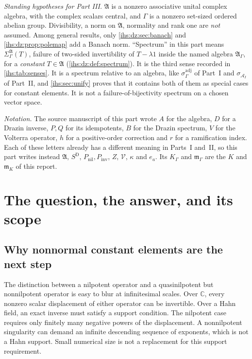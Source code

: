 \documentclass[11pt,a4paper]{article}
\numberwithin{equation}{section}
\theoremstyle{definition}
\theoremstyle{remark}
\newcommand{\C}{\mathbb C}
\newcommand{\K}{K}
\newcommand{\mK}{\mathfrak m_K}
\newcommand{\Arf}{\mathcal A_I}
\newcommand{\Alg}{\mathfrak A}
\newcommand{\AlgG}{\mathfrak A_\Gamma}
\newcommand{\SigA}{\Sigma^{\Alg}_\Gamma}
\begin{document}
\emph{Standing hypotheses for Part III.} $\Alg$ is a nonzero associative
unital complex algebra, with the complex scalars central, and $\Gamma$ is a
nonzero set-sized ordered abelian group. Divisibility, a norm on $\Alg$,
normality and rank one are \emph{not} assumed. Among general results, only
\cref{ihs:dz:sec:banach} and \cref{ihs:dz:prop:polemap} add a Banach norm.
``Spectrum'' in this part means $\SigA(T)$, failure of two-sided
invertibility of $T-\lambda1$ inside the named algebra $\AlgG$, for a
\emph{constant} $T\in\Alg$ (\cref{ihs:dz:def:spectrum}). It is the third
sense recorded in \cref{ihs:tab:senses}. It is a spectrum relative to an
algebra, like $\sigma^{\mathrm{adj}}_\Gamma$ of Part~I and $\sigma_{\Arf}$ of
Part~II, and \cref{ihs:sec:unify} proves that it contains both of them as
special cases for constant elements. It is not a failure-of-bijectivity
spectrum on a chosen vector space.

\emph{Notation.} The source manuscript of this part wrote $A$ for the
algebra, $D$ for a Drazin inverse, $P,Q$ for its idempotents, $B$ for the
Drazin spectrum, $V$ for the Volterra operator, $h$ for a positive-order
correction and $r$ for a ramification index. Each of these letters already
has a different meaning in Parts~I and~II, so this part writes instead
$\Alg$, $S^{\mathrm D}$, $P_{\mathrm{nil}},P_{\mathrm{inv}}$, $Z$,
$\mathcal V$, $\kappa$ and $e_a$. Its $K_\Gamma$ and $\mathfrak m_\Gamma$
are the $\K$ and $\mK$ of this report.

\section{The question, the answer, and its scope}\label{ihs:dz:sec:intro}

\subsection{Why nonnormal constant elements are the next step}\label{ihs:dz:sec:why}
The distinction between a nilpotent operator and a quasinilpotent but
nonnilpotent operator is easy to blur at infinitesimal scales. Over $\C$,
every nonzero scalar displacement of either operator can be invertible.
Over a Hahn field, an exact inverse must satisfy a support condition. The
nilpotent case requires only finitely many negative powers of the
displacement. A nonnilpotent singularity can demand an infinite descending
sequence of exponents, which is not a Hahn support. Small numerical size is
not a replacement for this support requirement.
\end{document}
